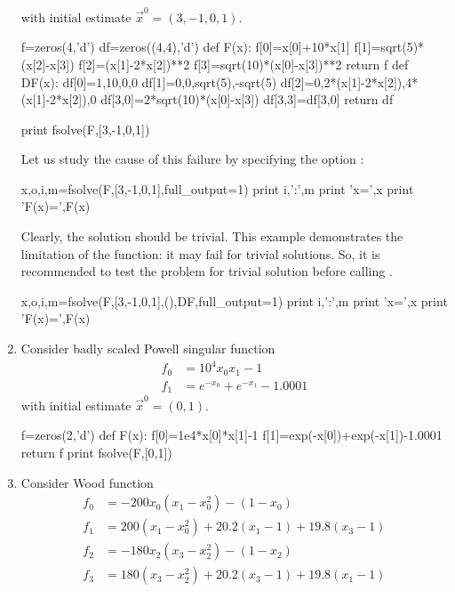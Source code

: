 \begin{enumerate}
  with initial estimate $\vec x^0=(3,-1,0,1)$.
\begin{python}
f=zeros(4,'d')
df=zeros((4,4),'d')
def F(x):
    f[0]=x[0]+10*x[1]
    f[1]=sqrt(5)*(x[2]-x[3])
    f[2]=(x[1]-2*x[2])**2
    f[3]=sqrt(10)*(x[0]-x[3])**2
    return f
def DF(x):
    df[0]=1,10,0,0
    df[1]=0,0,sqrt(5),-sqrt(5)
    df[2]=0,2*(x[1]-2*x[2]),4*(x[1]-2*x[2]),0
    df[3,0]=2*sqrt(10)*(x[0]-x[3])
    df[3,3]=df[3,0]
    return df
\end{python}
\begin{pythonrun}
print fsolve(F,[3,-1,0,1])
\end{pythonrun}
Let us study the cause of this failure by specifying the option
:
\begin{pythonrun}
x,o,i,m=fsolve(F,[3,-1,0,1],full_output=1)
print i,':',m
print 'x=',x
print 'F(x)=',F(x)
\end{pythonrun}
Clearly, the solution should be trivial. This example demonstrates the
limitation of the  function: it may fail for trivial
solutions. So, it is recommended to test the problem for trivial
solution before calling .
\begin{pythonrun}
x,o,i,m=fsolve(F,[3,-1,0,1],(),DF,full_output=1)
print i,':',m
print 'x=',x
print 'F(x)=',F(x)
\end{pythonrun}
\item Consider badly scaled Powell singular function
  \begin{displaymath}
    \begin{split}
      f_0&=10^4x_0x_1-1\\
      f_1&=e^{-x_0}+e^{-x_1}-1.0001
    \end{split}
  \end{displaymath}
  with initial estimate $\vec x^0=(0,1)$.
\begin{pythonrun}
f=zeros(2,'d')
def F(x):
    f[0]=1e4*x[0]*x[1]-1
    f[1]=exp(-x[0])+exp(-x[1])-1.0001
    return f
print fsolve(F,[0,1])
\end{pythonrun}
\item Consider Wood function
  \begin{displaymath}
    \begin{split}
      f_0&=-200x_0(x_1-x_0^2)-(1-x_0)\\
      f_1&=200(x_1-x_0^2)+20.2(x_1-1)+19.8(x_3-1)\\
      f_2&=-180x_2(x_3-x_2^2)-(1-x_2)\\
      f_3&=180(x_3-x_2^2)+20.2(x_3-1)+19.8(x_1-1)
    \end{split}

\end{displaymath}
\end{enumerate}
